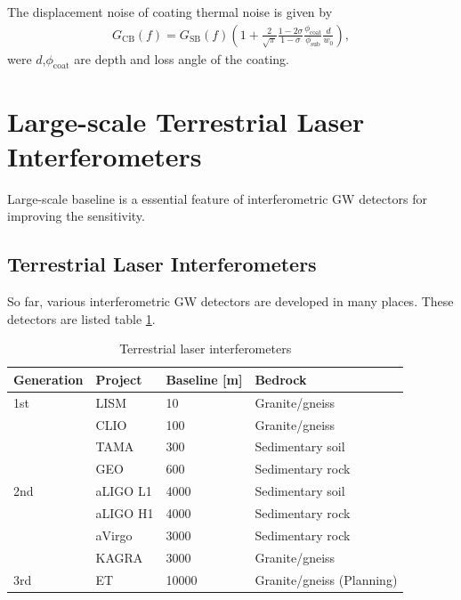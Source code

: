 The displacement noise of coating thermal noise is given by \cite{numata2003wide,harry2002thermal}
\begin{eqnarray}
  G_{\mathrm{CB}}(f)=G_{\mathrm{SB}}(f)\left(1+\frac{2}{\sqrt{\pi}} \frac{1-2 \sigma}{1-\sigma} \frac{\phi_{\mathrm{coat}}}{\phi_{\mathrm{sub}}} \frac{d}{w_{0}}\right), 
\end{eqnarray}
were $d$,$\phi_{\mathrm{coat}}$ are depth and loss angle of the coating.


\newpage
\section{Large-scale Terrestrial Laser Interferometers}
Large-scale baseline is a essential feature of interferometric GW detectors for improving the sensitivity. 

\subsection{Terrestrial Laser Interferometers}
So far, various interferometric GW detectors are developed in many places. These detectors are listed table \ref{tb:tb101}.

\begin{table}[h] 
  \begin{center}
    \caption{Terrestrial laser interferometers \cite{chen2017brief,beker2013low}}\label{tb:tb101}
    \begin{tabular}{llll} 
      \hline
      Generation &Project & Baseline [m] & Bedrock \\ \hline \hline
      1st &LISM  & 10    & Granite/gneiss \\ 
      &CLIO  & 100   & Granite/gneiss \\
      &TAMA  & 300   & Sedimentary soil \cite{1970449}\\ 
      &GEO   & 600   & Sedimentary rock \\ \hline
      2nd &aLIGO L1 & 4000  & Sedimentary soil \\
      &aLIGO H1 & 4000  & Sedimentary rock \\
      &aVirgo   & 3000  & Sedimentary rock \\
      &KAGRA   & 3000  & Granite/gneiss \\ \hline
      3rd &ET      & 10000 & Granite/gneiss (Planning) \\
      \hline
    \end{tabular}
  \end{center}
\end{table}


